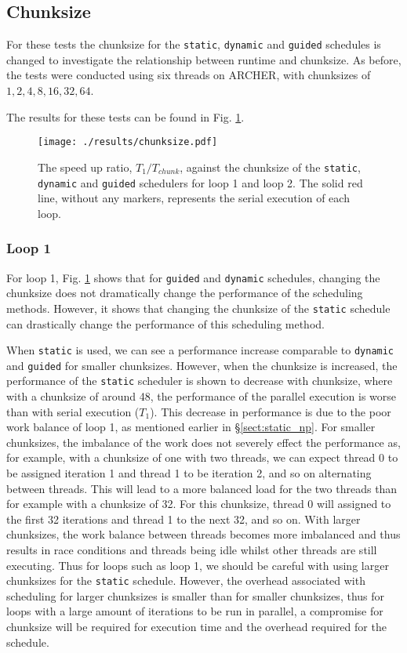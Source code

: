 \documentclass[11pt, a4paper]{article}
\begin{document}
		\subsection{Chunksize} \label{sect:chunksize}
			For these tests the chunksize for the \texttt{static}, \texttt{dynamic} and \texttt{guided} schedules is changed to investigate the relationship between runtime and chunksize. As before, the tests were conducted using six threads on ARCHER, with chunksizes of $1, 2, 4, 8, 16, 32, 64$.
			
			The results for these tests can be found in Fig. \ref{fig:chunksize}. 
			
			\begin{figure}
				\centering
				\texttt{[image: ./results/chunksize.pdf]}
				\caption{The speed up ratio, $T_{1}/T_{chunk}$, against the chunksize of the \texttt{static}, \texttt{dynamic} and \texttt{guided} schedulers for loop 1 and loop 2. The solid red line, without any markers, represents the serial execution of each loop.}
				\label{fig:chunksize}
			\end{figure}
			
			\subsubsection{Loop 1} \label{sect:loop1_chunks}
				For loop 1, Fig. \ref{fig:chunksize} shows that for \texttt{guided} and \texttt{dynamic} schedules, changing the chunksize does not dramatically change the performance of the scheduling methods. However, it shows that changing the chunksize of the \texttt{static} schedule can drastically change the performance of this scheduling method. 
				
				When \texttt{static} is used, we can see a performance increase comparable to \texttt{dynamic} and \texttt{guided} for smaller chunksizes. However, when the chunksize is increased, the performance of the \texttt{static} scheduler is shown to decrease with chunksize, where with a chunksize of around 48, the performance of the parallel execution is worse than with serial execution ($T_{1}$). This decrease in performance is due to the poor work balance of loop 1, as mentioned earlier in \S\ref{sect:static_np}. For smaller chunksizes, the imbalance of the work does not severely effect the performance as, for example, with a chunksize of one with two threads, we can expect thread 0 to be assigned iteration 1 and thread 1 to be iteration 2, and so on alternating between threads. This will lead to a more balanced load for the two threads than for example with a chunksize of 32. For this chunksize, thread 0 will assigned to the first 32 iterations and thread 1 to the next 32, and so on. With larger chunksizes, the work balance between threads becomes more imbalanced and thus results in race conditions and threads being idle whilst other threads are still executing. Thus for loops such as loop 1, we should be careful with using larger chunksizes for the \texttt{static} schedule. However, the overhead associated with scheduling for larger chunksizes is smaller than for smaller chunksizes, thus for loops with a large amount of iterations to be run in parallel, a compromise for chunksize will be required for execution time and the overhead required for the schedule.
\end{document}
